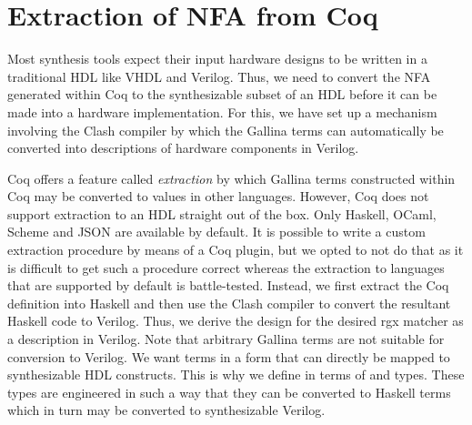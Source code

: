 \section{Extraction of NFA from Coq}
Most synthesis tools expect their input hardware designs to be written
in a traditional \gls{HDL} like VHDL and Verilog.
Thus, we need to convert the \gls{NFA} generated within Coq to the
synthesizable subset of an \gls{HDL} before it can be made into a
hardware implementation.
For this, we have set up a mechanism
involving the Clash compiler
by which the Gallina terms can automatically be converted into
descriptions of hardware components in Verilog.

Coq offers a feature called \emph{extraction} by which Gallina
terms constructed within Coq may be converted to values in other
languages.
However, Coq does not support extraction to an \gls{HDL} straight out
of the box.
Only Haskell, OCaml, Scheme and JSON are available by default.
It is possible to write a custom extraction procedure by means of a
Coq plugin, but we opted to not do that as it is difficult to get such
a procedure correct whereas the extraction to languages that are
supported by default is battle-tested.
Instead, we first extract the Coq definition into Haskell and then use
the Clash compiler to convert the resultant Haskell code to Verilog.
Thus, we derive the design for the desired \gls{rgx} matcher as a
description in Verilog.
%
Note that arbitrary Gallina terms are not suitable for conversion to
Verilog.
We want terms in a form that can directly be mapped to synthesizable
\gls{HDL} constructs.
This is why we define  in terms of  and
 types.
These types are engineered in such a way that they can be converted to
Haskell terms which in turn may be converted to synthesizable Verilog.

